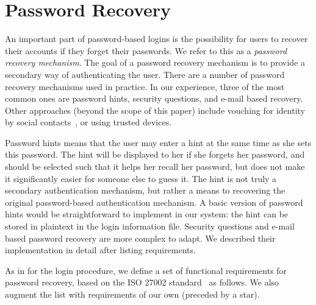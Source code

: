 \section{Password Recovery}  An important part of
password-based logins is the possibility for users to recover their
accounts if they forget their passwords. We refer to this as a
\emph{password recovery mechanism}. The goal of a password recovery
mechanism is to provide a secondary way of authenticating the
user. There are a number of password recovery mechanisms used in
practice. In our experience, three of the most common ones are
password hints, security questions, and e-mail based recovery. Other
approaches (beyond the scope of this paper) include vouching for identity by
social contacts~\cite{Brainard06}, or using trusted devices.

Password hints means that the user may enter a hint at the same time as she
sets this password. The hint will be displayed to her if she forgets her
password, and should be selected such that it helps her recall her password,
but does not make it significantly easier for someone else to guess it. The
hint is not truly a secondary authentication mechanism, but rather a means to
recovering the original password-based authentication mechanism. A basic 
version of password hints would be straightforward to implement in our system: 
the hint can be stored in plaintext in the login information file. 
Security questions and e-mail based password recovery are more complex to adapt.
We described their implementation in detail after listing requirements.

As in  for the login procedure, we  define a set of functional
requirements for password recovery, based on the ISO 27002 standard~\cite{iso27002} as follows. We
also augment the list with requirements of our own (preceded by a star).

